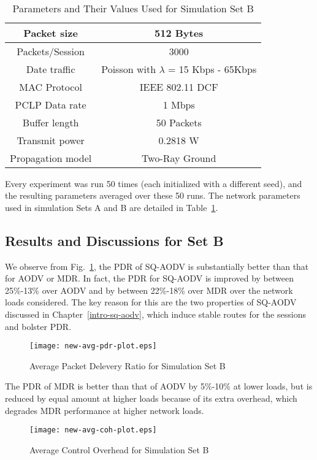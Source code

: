 \begin{table}[htbp]
 \centering
  \caption{Parameters and Their Values Used for Simulation Set B} 
  \hfill \\
  \begin{tabular}{|c|c|}
  \hline
  Packet size & 512 Bytes\\
  \hline
  Packets/Session & 3000 \\
  \hline
  Date traffic & Poisson with $\lambda$ = 15 Kbps - 65Kbps\\
  \hline
  MAC Protocol & IEEE 802.11 DCF\\
  \hline
  PCLP Data rate & 1 Mbps \\
  \hline
  Buffer length & 50 Packets \\
  \hline
  Transmit power & 0.2818 W\\
  \hline
  Propagation model & Two-Ray Ground\\
  \hline
  \end{tabular}
  \label{tab57}
\end{table}

Every experiment was run 50 times (each initialized with a different seed), and the resulting parameters averaged over these 50 runs. The network parameters used in simulation Sets A and B are detailed in Table~\ref{tab57}.

\subsection{Results and Discussions for Set B}
\label{results-setb}
We observe from Fig.~\ref{fig516}, the PDR of SQ-AODV is substantially better than that for AODV or MDR. In fact, the PDR for SQ-AODV is improved by between 25\%-13\% over AODV and by between 22\%-18\% over MDR over the network loads considered. The key reason for this are  the two properties of SQ-AODV discussed in Chapter~\ref{intro-sq-aodv}, which induce stable routes for the sessions and bolster PDR.

\begin{figure}[htbp]
	\centering
	\texttt{[image: new-avg-pdr-plot.eps]}
	\caption{Average Packet Delevery Ratio for Simulation Set B}
	\label{fig516}
\end{figure}

The PDR of MDR is better than that of AODV by 5\%-10\% at lower loads, but is reduced by equal amount 
at higher loads because of its extra overhead, which degrades MDR performance at higher network loads.

\begin{figure}[htbp]
	\centering
	\texttt{[image: new-avg-coh-plot.eps]}
	\caption{Average Control Overhead for Simulation Set B}
	\label{fig517}
\end{figure}

